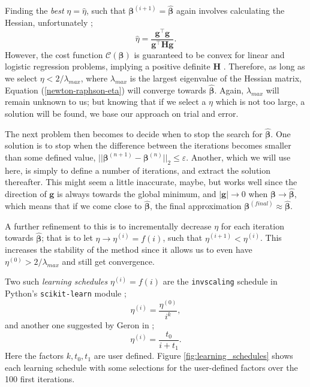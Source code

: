 \documentclass[]{article}
\begin{document}
Finding the \textit{best} $\eta = \hat{\eta}$, such that $\mathbf{\beta}^{(i+1)} = \mathbf{\hat{\beta}}$ again involves calculating the Hessian, unfortunately \cite{fys-stk4155-notes}; 
\begin{equation}
	\hat{\eta} = \frac{\mathbf{g}^\intercal \mathbf{g}}{\mathbf{g}^\intercal \mathbf{H} \mathbf{g}}.
\end{equation}
However, the cost function $\mathcal{C}(\mathbf{\beta})$ is guaranteed to be convex for linear and logistic regression problems, implying a positive definite $\mathbf{H}$ \cite{murphy2012machine}. Therefore, as long as we select $\eta < 2/\lambda_{max}$, where $\lambda_{max}$ is the largest eigenvalue of the Hessian matrix, Equation (\ref{newton-raphson-eta}) will converge towards $\mathbf{\hat{\beta}}$. Again, $\lambda_{max}$ will remain unknown to us; but knowing that if we select a $\eta$ which is not too large, a solution will be found, we base our approach on trial and error. 

\vspace{5mm}

The next problem then becomes to decide when to stop the search for $\mathbf{\hat{\beta}}$. One solution is to stop when the difference between the iterations becomes smaller than some defined value, $||\mathbf{\beta}^{(n+1)} - \mathbf{\beta}^{(n)}||_2 \le \varepsilon$. Another, which we will use here, is simply to define a number of iterations, and extract the solution thereafter. This might seem a little inaccurate, maybe, but works well since the direction of $\mathbf{g}$ is always towards the global minimum, and $|\mathbf{g}| \rightarrow 0$ when $\mathbf{\beta} \rightarrow \mathbf{\hat{\beta}}$, which means that if we come close to $\mathbf{\hat{\beta}}$, the final approximation $\mathbf{\beta}^{(final)} \approx \mathbf{\hat{\beta}}$.

A further refinement to this is to incrementally decrease $\eta$ for each iteration towards $\mathbf{\hat{\beta}}$; that is to let $\eta \rightarrow \eta^{(i)} = f(i)$, such that $\eta^{(i+1)} < \eta^{(i)}$. This increases the stability of the method since it allows us to even have $\eta^{(0)} > 2/\lambda_{max}$ and still get convergence.

Two such \textit{learning schedules} $\eta^{(i)} = f(i)$ are the \lstinline|invscaling| schedule in Python's \lstinline|scikit-learn| module \cite{skl};
\begin{equation} \label{invscaling}
	\eta^{(i)} = \frac{\eta^{(0)}}{i^k},
\end{equation}
and another one suggested by Geron in \cite{geron2019hands};
\begin{equation} \label{geron}
	\eta^{(i)} = \frac{t_0}{i + t_1}.
\end{equation}
Here the factors $k, t_0, t_1$ are user defined. Figure \ref{fig:learning_schedules} shows each learning schedule with some selections for the user-defined factors over the 100 first iterations.
\end{document}
